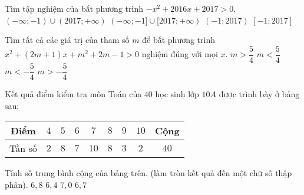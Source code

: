\begin{ex}%
    Tìm tập nghiệm của bất phương trình $-x^2+2016x+2017>0$.
    \choice
    {$(-\infty;-1)\cup(2017;+\infty)$}
    {$(-\infty;-1]\cup[2017;+\infty)$}
    {\True $(-1;2017)$}
    {$[-1;2017] $}
\end{ex}
\begin{ex}%
    Tìm tất cả các giá trị của tham số $m$ để bất phương trình $x^2+(2m+1)x+m^2+2m-1>0$ nghiệm đúng với mọi $x$.
    \choice
    {\True $m>\dfrac{5}{4}$}
    {$m<\dfrac{5}{4}$}
    {$m<-\dfrac{5}{4}$}
    {$m>-\dfrac{5}{4}$}
\end{ex}

\begin{ex}%
    Kết quả điểm kiểm tra môn Toán của $40$ học sinh lớp $10A$ được trình bày ở bảng sau:
    \begin{center}
        \begin{tabular}{|c|c|c|c|c|c|c|c|c|}
            \hline 
            Điểm&$4$  &$5$  &$6$  &$7$  &$8$  &$9$  &$10$  &Cộng  \\ 
            \hline 
            Tần số&$2$  &$8$  &$7$  &$10$  &$8$  &$3$  &$2$  &$40$  \\ 
            \hline 
        \end{tabular} 
    \end{center}
    Tính số trung bình cộng của bảng trên. (làm tròn kết quả đến một chữ số thập phân).
    \choice
    {\True $6,\!8$}
    {$6,\!4$}
    {$7,\!0$}
    {$6,\!7$}
\end{ex}	

